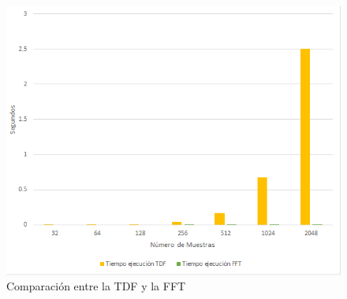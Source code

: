 \begin{figure}[H]
	\centering
	\includegraphics[scale=.88]{img/comparacion.png}
	\caption{Comparación entre la TDF y la FFT}
	\label{fig:prebsdDa2}		
\end{figure}